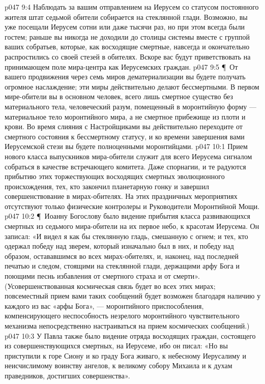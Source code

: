 \vs p047 9:4 Наблюдать за вашим отправлением на Иерусем со статусом постоянного жителя штат седьмой обители собирается на стеклянной глади. Возможно, вы уже посещали Иерусем сотни или даже тысячи раз, но при этом всегда были гостем; раньше вы никогда не доходили до столицы системы вместе с группой ваших собратьев, которые, как восходящие смертные, навсегда и окончательно распростились со своей стезей в обителях. Вскоре вас будут приветствовать на принимающем поле мира\hyp{}центра как Иерусемских граждан.
\vs p047 9:5 \P\ От вашего продвижения через семь миров дематериализации вы будете получать огромное наслаждение; эти миры действительно делают бессмертными. В первом мире\hyp{}обители вы в основном человек, всего лишь смертное существо без материального тела, человеческий разум, помещенный в моронтийную форму --- материальное тело моронтийного мира, а не смертное прибежище из плоти и крови. Во время слияния с Настройщиками вы действительно переходите от смертного состояния к бессмертному статусу, и ко времени завершения вами Иерусемской стези вы будете полноценными моронтийцами.
\vs p047 10:1 Прием нового класса выпускников мира\hyp{}обители служит для всего Иерусема сигналом собраться в качестве встречающего комитета. Даже спорнагии, и те радуются прибытию этих торжествующих восходящих смертных эволюционного происхождения, тех, кто закончил планетарную гонку и завершил совершенствование в мирах\hyp{}обителях. На этих праздничных мероприятиях отсутствуют только физические контролеры и Руководители Моронтийной Мощи.
\vs p047 10:2 \P\ Иоанну Богослову было видение прибытия класса развивающихся смертных из седьмого мира\hyp{}обители на их первое небо, к красотам Иерусема. Он записал: «И видел я как бы стеклянную гладь, смешанную с огнем; и тех, кто одержал победу над зверем, который изначально был в них, и победу над образом, остававшимся во всех мирах\hyp{}обителях, и, наконец, над последней печатью и следом, стоящими на стеклянной глади, держащими арфу Бога и поющими песнь избавления от смертного страха и от смерти». (Усовершенствованная космическая связь будет во всех этих мирах; повсеместный прием вами таких сообщений будет возможен благодаря наличию у каждого из вас «арфы Бога», --- моронтийного приспособления, компенсирующего неспособность незрелого моронтийного чувствительного механизма непосредственно настраиваться на прием космических сообщений.)
\vs p047 10:3 У Павла также было видение отряда восходящих граждан, состоящего из совершенствующихся смертных, на Иерусеме, ибо он писал: «Но вы приступили к горе Сиону и ко граду Бога живаго, к небесному Иерусалиму и неисчислимому воинству ангелов, к великому собору Михаила и к духам праведников, достигших совершенства».
